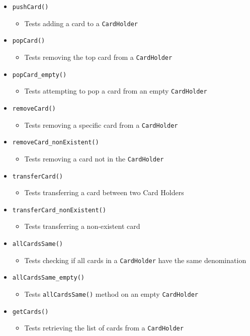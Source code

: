\documentclass{article}
\begin{document}
    \begin{itemize}
        \item \texttt{pushCard()}
        \begin{itemize}
            \item Tests adding a card to a \texttt{CardHolder}
        \end{itemize}
        \item \texttt{popCard()}
        \begin{itemize}
            \item Tests removing the top card from a \texttt{CardHolder}
        \end{itemize}
        \item \texttt{popCard\_empty()}
        \begin{itemize}
            \item Tests attempting to pop a card from an empty \texttt{CardHolder}
        \end{itemize}
        \item \texttt{removeCard()}
        \begin{itemize}
            \item Tests removing a specific card from a \texttt{CardHolder}
        \end{itemize}
        \item \texttt{removeCard\_nonExistent()}
        \begin{itemize}
            \item Tests removing a card not in the \texttt{CardHolder}
        \end{itemize}
        \item \texttt{transferCard()}
        \begin{itemize}
            \item Tests transferring a card between two Card Holders
        \end{itemize}
        \item \texttt{transferCard\_nonExistent()}
        \begin{itemize}
            \item Tests transferring a non-existent card
        \end{itemize}
        \item \texttt{allCardsSame()}
        \begin{itemize}
            \item Tests checking if all cards in a \texttt{CardHolder} have the same denomination
        \end{itemize}
        \item \texttt{allCardsSame\_empty()}
        \begin{itemize}
            \item Tests \texttt{allCardsSame()} method on an empty \texttt{CardHolder}
        \end{itemize}
        \item \texttt{getCards()}
        \begin{itemize}
            \item Tests retrieving the list of cards from a \texttt{CardHolder}
        \end{itemize}
    \end{itemize}
\end{document}

